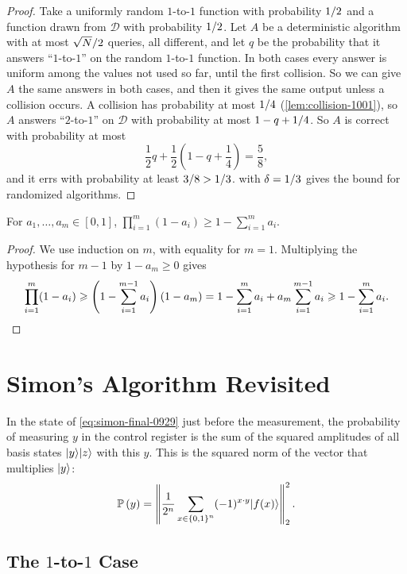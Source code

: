 \begin{proof}
    Take a uniformly random $1$-to-$1$ function with probability $\sfrac{1}{2}$ and a function drawn
    from $\mathcal{D}$ with probability $\sfrac{1}{2}$. Let $A$ be a deterministic algorithm with at
    most $\sfrac{\sqrt{N}}{2}$ queries, all different, and let $q$ be the probability that it answers
    ``$1$-to-$1$'' on the random $1$-to-$1$ function. In both cases every answer is uniform among the
    values not used so far, until the first collision. So we can give $A$ the same answers in both
    cases, and then it gives the same output unless a collision occurs. A collision has probability
    at most $\sfrac{1}{4}$ (\cref{lem:collision-1001}), so $A$ answers ``$2$-to-$1$'' on
    $\mathcal{D}$ with probability at most $1 - q + \sfrac{1}{4}$. So $A$ is correct with probability
    at most
    \[\frac{1}{2} q + \frac{1}{2}\left(1 - q + \frac{1}{4}\right) = \frac{5}{8},\]
    and it errs with probability at least $\sfrac{3}{8} > \sfrac{1}{3}$.  with
    $\delta = \sfrac{1}{3}$ gives the bound for randomized algorithms.
\end{proof}

\begin{claim}\label{lem:prodsum-1001}
    For $a_1, \dots, a_m \in [0, 1]$, $\prod_{i=1}^{m} (1 - a_i) \geq 1 - \sum_{i=1}^{m} a_i$.
\end{claim}

\begin{proof}
    We use induction on $m$, with equality for $m = 1$. Multiplying the hypothesis for $m - 1$ by
    $1 - a_m \geq 0$ gives
    \[\prod_{i=1}^{m} (1 - a_i) \geq \left(1 - \sum_{i=1}^{m-1} a_i\right)(1 - a_m)
        = 1 - \sum_{i=1}^{m} a_i + a_m \sum_{i=1}^{m-1} a_i \geq 1 - \sum_{i=1}^{m} a_i. \qedhere\]
\end{proof}

\section{Simon's Algorithm Revisited}

In the state of \cref{eq:simon-final-0929} just before the measurement, the probability of measuring
$y$ in the control register is the sum of the squared amplitudes of all basis states
$\ket{y}\ket{z}$ with this $y$. This is the squared norm of the vector that multiplies $\ket{y}$:
\[\prob{y} = \norm{\frac{1}{2^n} \sum_{x \in \set{0,1}^n} (-1)^{x \cdot y} \ket{f(x)}}_2^2.\]

\subsection{The \texorpdfstring{$1$}{1}-to-\texorpdfstring{$1$}{1} Case}

